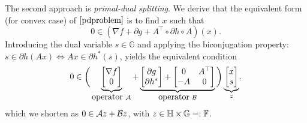 {{{The second approach is \emph{primal-dual splitting}. %
}
We derive that the equivalent form (for convex case) of $\eqref{pdproblem}$ is to find $x$ such that
\begin{equation}
0\in (\nabla f+\partial g+A^\top\circ\partial h\circ A)(x).
\end{equation}
Introducing the dual variable $s\in\mathbb{G}$ and applying the biconjugation property:  $s\in \partial h(Ax)\Leftrightarrow Ax\in \partial h^*(s)$, yields the equivalent condition
\begin{equation}
0\in\bigg(\underbrace{\begin{bmatrix}
\nabla f\\
0
\end{bmatrix}}_{\mbox{operator}~\cA}+\underbrace{
\begin{bmatrix}
\partial g\\
\partial h^*
\end{bmatrix}+\begin{bmatrix}
0&A^\top\\
-A&0
\end{bmatrix}}_{\mbox{operator}~\cB}\bigg) \underbrace{\begin{bmatrix}
x\\
s
\end{bmatrix}}_{z},\label{pdkkt}
\end{equation}
which we shorten as $0\in{\mathcal{A}} z+{\mathcal{B}} z$, with $z\in\mathbb{H}\times\mathbb{G}=:\mathbb{F}$.

}}
